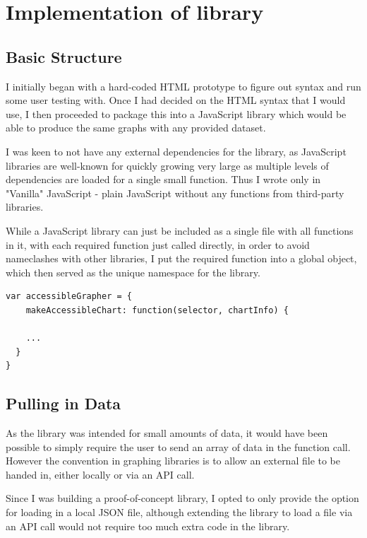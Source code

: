 \documentclass[ %
                    author={Aleena Baig},
                supervisor={Dr Simon Lock},
                    degree={BSc},
                     title={On Making Web Accessible Graphs},
                  subtitle={},
                      year={2019} ]{dissertation}
\begin{document}
\section{Implementation of library}

\subsection{Basic Structure}

I initially began with a hard-coded HTML prototype to figure out syntax and run some user testing with. Once I had decided on the HTML syntax that I would use, I then proceeded to package this into a JavaScript library which would be able to produce the same graphs with any provided dataset.

I was keen to not have any external dependencies for the library, as JavaScript libraries are well-known for quickly growing very large as multiple levels of dependencies are loaded for a single small function. Thus I wrote only in "Vanilla" JavaScript - plain JavaScript without any functions from third-party libraries.

While a JavaScript library can just be included as a single file with all functions in it, with each required function just called directly, in order to avoid nameclashes with other libraries, I put the required function into a global object, which then served as the unique namespace for the library.
\newline
\begin{lstlisting}
var accessibleGrapher = {
    makeAccessibleChart: function(selector, chartInfo) {

    ...
  }
}
\end{lstlisting}

\subsection{Pulling in Data}

As the library was intended for small amounts of data, it would have been possible to simply require the user to send an array of data in the function call. However the convention in graphing libraries is to allow an external file to be handed in, either locally or via an API call.

Since I was building a proof-of-concept library, I opted to only provide the option for loading in a local JSON file, although extending the library to load a file via an API call would not require too much extra code in the library.
\end{document}
